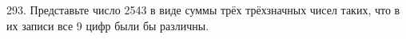 293. Представьте число 2543 в виде суммы трёх трёхзначных чисел таких, что в их записи все 9 цифр были бы различны.\\
